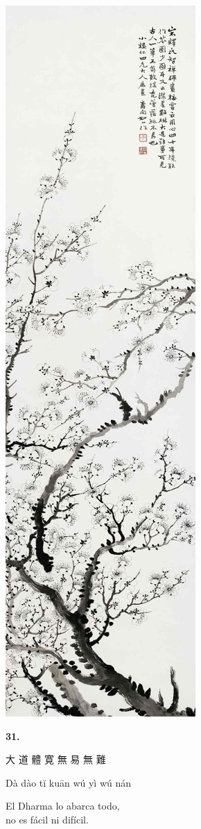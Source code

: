 \documentclass[
  a5paperpaper,
]{article}
\begin{document}
\hypertarget{01}{}
\includegraphics{../img/image07.jpg}

\begin{verseblock}

\newpage

\begin{center}\textbf{31.}\end{center}

大 道 體 寛 無 易 無 難

Dà dào tĭ kuān wú yì wú nán

El Dharma lo abarca todo,\\
no es fácil ni difícil.

\end{verseblock}
\end{document}

